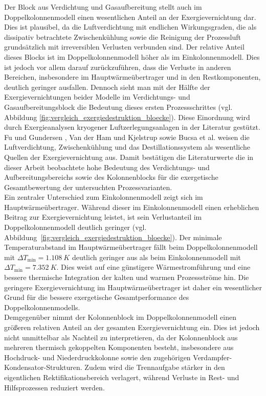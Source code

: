 Der Block aus Verdichtung und Gasaufbereitung stellt auch im Doppelkolonnenmodell einen wesentlichen Anteil an der Exergievernichtung dar. Dies ist plausibel, da die Luftverdichtung mit endlichen Wirkungsgraden, die als dissipativ betrachtete Zwischenkühlung sowie die Reinigung der Prozessluft grundsätzlich mit irreversiblen Verlusten verbunden sind. Der relative Anteil dieses Blocks ist im Doppelkolonnenmodell höher als im Einkolonnenmodell. Dies ist jedoch vor allem darauf zurückzuführen, dass die Verluste in anderen Bereichen, insbesondere im Hauptwärmeübertrager und in den Restkomponenten, deutlich geringer ausfallen. Dennoch sieht man mit der Hälfte der Exergievernichtungen beider Modelle im Verdichtungs- und Gasaufbereitungsblock die Bedeutung dieses ersten Prozessschrittes (vgl. Abbildung \ref{fig:vergleich_exergiedestruktion_bloecke}). Diese Einordnung wird durch Exergieanalysen kryogener Luftzerlegungsanlagen in der Literatur gestützt. Fu und Gundersen \cite{fuUsingExergyAnalysis2012}, Van der Ham und Kjelstrup \cite{vanderhamExergyAnalysisTwo2010c} sowie Bucsa et al. \cite{bucsaExergeticAnalysisCryogenic2022a} weisen die Luftverdichtung, Zwischenkühlung und das Destillationssystem als wesentliche Quellen der Exergievernichtung aus. Damit bestätigen die Literaturwerte die in dieser Arbeit beobachtete hohe Bedeutung des Verdichtungs- und Aufbereitungsbereichs sowie des Kolonnenblocks für die exergetische Gesamtbewertung der untersuchten Prozessvarianten. \\
Ein zentraler Unterschied zum Einkolonnenmodell zeigt sich im Hauptwärmeübertrager. Während dieser im Einkolonnenmodell einen erheblichen Beitrag zur Exergievernichtung leistet, ist sein Verlustanteil im Doppelkolonnenmodell deutlich geringer (vgl. Abbildung~\ref{fig:vergleich_exergiedestruktion_bloecke}). Der minimale Temperaturabstand im Hauptwärmeübertrager fällt beim Doppelkolonnenmodell mit \(\Delta T_\mathrm{min}=\SI{1.108}{K}\) deutlich geringer aus als beim Einkolonnenmodell mit \(\Delta T_\mathrm{min}=\SI{7.352}{K}\).
Dies weist auf eine günstigere Wärmestromführung und eine bessere thermische Integration der kalten und warmen Prozessströme hin. Die geringere Exergievernichtung im Hauptwärmeübertrager ist daher ein wesentlicher Grund für die bessere exergetische Gesamtperformance des Doppelkolonnenmodells.\\
Demgegenüber nimmt der Kolonnenblock im Doppelkolonnenmodell einen größeren relativen Anteil an der gesamten Exergievernichtung ein. Dies ist jedoch nicht unmittelbar als Nachteil zu interpretieren, da der Kolonnenblock aus mehreren thermisch gekoppelten Komponenten besteht, insbesondere aus Hochdruck- und Niederdruckkolonne sowie den zugehörigen Verdampfer-Kondensator-Strukturen. Zudem wird die Trennaufgabe stärker in den eigentlichen Rektifikationsbereich verlagert, während Verluste in Rest- und Hilfsprozessen reduziert werden.\\
